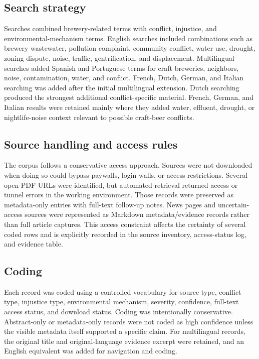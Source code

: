 \documentclass[man,12pt]{apa7}
\begin{document}
\subsection{Search strategy}

Searches combined brewery-related terms with conflict, injustice, and environmental-mechanism terms. English searches included combinations such as brewery wastewater, pollution complaint, community conflict, water use, drought, zoning dispute, noise, traffic, gentrification, and displacement. Multilingual searches added Spanish and Portuguese terms for craft breweries, neighbors, noise, contamination, water, and conflict. French, Dutch, German, and Italian searching was added after the initial multilingual extension. Dutch searching produced the strongest additional conflict-specific material. French, German, and Italian results were retained mainly where they added water, effluent, drought, or nightlife-noise context relevant to possible craft-beer conflicts.

\subsection{Source handling and access rules}

The corpus follows a conservative access approach. Sources were not downloaded when doing so could bypass paywalls, login walls, or access restrictions. Several open-PDF URLs were identified, but automated retrieval returned access or tunnel errors in the working environment. Those records were preserved as metadata-only entries with full-text follow-up notes. News pages and uncertain-access sources were represented as Markdown metadata/evidence records rather than full article captures. This access constraint affects the certainty of several coded rows and is explicitly recorded in the source inventory, access-status log, and evidence table.

\subsection{Coding}

Each record was coded using a controlled vocabulary for source type, conflict type, injustice type, environmental mechanism, severity, confidence, full-text access status, and download status. Coding was intentionally conservative. Abstract-only or metadata-only records were not coded as high confidence unless the visible metadata itself supported a specific claim. For multilingual records, the original title and original-language evidence excerpt were retained, and an English equivalent was added for navigation and coding.
\end{document}

